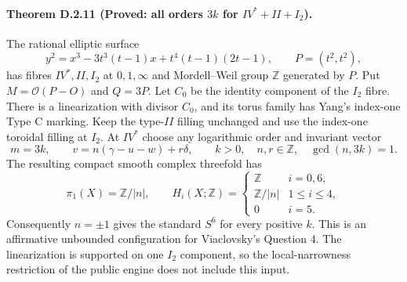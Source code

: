 \paragraph{Theorem D.2.11 (Proved: all orders $3k$ for $IV^*+II+I_2$).}
The rational elliptic surface
\[
 y^2=x^3-3t^3(t-1)x+t^4(t-1)(2t-1),
 \qquad P=(t^2,t^2),
 \tag{D.C1}
\]
has fibres $IV^*,II,I_2$ at $0,1,\infty$ and Mordell--Weil group
$\mathbb Z$ generated by $P$. Put $M=\mathcal O(P-O)$ and
$Q=3P$. Let $C_0$ be the identity component of the $I_2$ fibre.
There is a linearization with divisor $C_0$, and its torus
family has Yang's index-one Type C marking. Keep the type-$II$
filling unchanged and use the index-one toroidal filling at
$I_2$. At $IV^*$ choose any logarithmic order and invariant vector
\[
 m=3k,\qquad v=n(\gamma-u-w)+r\delta,
 \qquad k>0,\quad n,r\in\mathbb Z,
 \quad\gcd(n,3k)=1.
\]
The resulting compact smooth complex threefold has
\[
 \pi_1(X)=\mathbb Z/|n|,\qquad
 H_i(X;\mathbb Z)=
 \begin{cases}
 \mathbb Z&i=0,6,\\
 \mathbb Z/|n|&1\leq i\leq4,\\
 0&i=5.
 \end{cases}
\]
Consequently $n=\pm1$ gives the standard $S^6$ for every positive
$k$. This is an affirmative unbounded configuration for
Viaclovsky's Question 4. The linearization is supported on one
$I_2$ component, so the local-narrowness restriction of the public
engine does not include this input.
